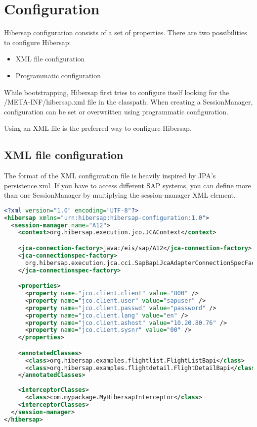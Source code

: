 
\chapter{Configuration}
\label{cha:Configuration}

Hibersap configuration consists of a set of properties. 
There are two possibilities to configure Hibersap: 
\begin{itemize}
  \item XML file configuration 
  \item Programmatic configuration
\end{itemize}

While bootstrapping, Hibersap first tries to configure itself looking for the \linebreak /META-INF/hibersap.xml file in the
classpath. When creating a SessionManager, configuration can be set or overwritten using programmatic configuration.

Using an XML file is the preferred way to configure Hibersap.


\section{XML file configuration}
\label{sec:XML file configuration}

The format of the XML configuration file is heavily inspired by JPA's persistence.xml.
If you have to access different SAP systems, you can define more than one SessionManager by multiplying the
session-manager XML element.

\begin{lstlisting}[language=XML,caption=hibersap.xml]
<?xml version="1.0" encoding="UTF-8"?>
<hibersap xmlns="urn:hibersap:hibersap-configuration:1.0">
  <session-manager name="A12">
    <context>org.hibersap.execution.jco.JCAContext</context>

    <jca-connection-factory>java:/eis/sap/A12</jca-connection-factory>
    <jca-connectionspec-factory>
      org.hibersap.execution.jca.cci.SapBapiJcaAdapterConnectionSpecFactory
    </jca-connectionspec-factory>

    <properties>
      <property name="jco.client.client" value="800" />
      <property name="jco.client.user" value="sapuser" />
      <property name="jco.client.passwd" value="password" />
      <property name="jco.client.lang" value="en" />
      <property name="jco.client.ashost" value="10.20.80.76" />
      <property name="jco.client.sysnr" value="00" />
    </properties>

    <annotatedClasses>
      <class>org.hibersap.examples.flightlist.FlightListBapi</class>
      <class>org.hibersap.examples.flightdetail.FlightDetailBapi</class>
    </annotatedClasses>
    
    <interceptorClasses>
      <class>com.mypackage.MyHibersapInterceptor</class>
    <interceptorClasses>
  </session-manager>
</hibersap>
\end{lstlisting}

